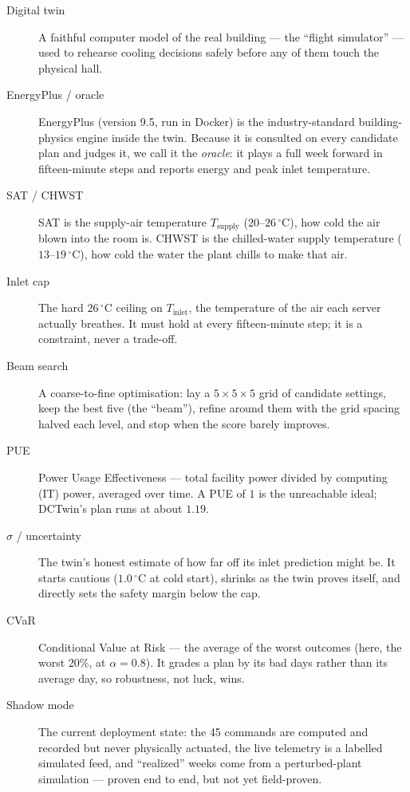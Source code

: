 \begin{description}
  \item[Digital twin] A faithful computer model of the real building --- the ``flight simulator'' --- used to rehearse cooling decisions safely before any of them touch the physical hall.
  \item[EnergyPlus / oracle] EnergyPlus (version 9.5, run in Docker) is the industry-standard building-physics engine inside the twin. Because it is consulted on every candidate plan and judges it, we call it the \emph{oracle}: it plays a full week forward in fifteen-minute steps and reports energy and peak inlet temperature.
  \item[SAT / CHWST] SAT is the supply-air temperature $T_{\text{supply}}$ ($20$--$26\,^\circ$C), how cold the air blown into the room is. CHWST is the chilled-water supply temperature ($13$--$19\,^\circ$C), how cold the water the plant chills to make that air.
  \item[Inlet cap] The hard $26\,^\circ$C ceiling on $T_{\text{inlet}}$, the temperature of the air each server actually breathes. It must hold at every fifteen-minute step; it is a constraint, never a trade-off.
  \item[Beam search] A coarse-to-fine optimisation: lay a $5\times5\times5$ grid of candidate settings, keep the best five (the ``beam''), refine around them with the grid spacing halved each level, and stop when the score barely improves.
  \item[PUE] Power Usage Effectiveness --- total facility power divided by computing (IT) power, averaged over time. A PUE of $1$ is the unreachable ideal; DCTwin's plan runs at about $1.19$.
  \item[$\sigma$ / uncertainty] The twin's honest estimate of how far off its inlet prediction might be. It starts cautious ($1.0\,^\circ$C at cold start), shrinks as the twin proves itself, and directly sets the safety margin below the cap.
  \item[CVaR] Conditional Value at Risk --- the average of the worst outcomes (here, the worst $20\%$, at $\alpha = 0.8$). It grades a plan by its bad days rather than its average day, so robustness, not luck, wins.
  \item[Shadow mode] The current deployment state: the 45 commands are computed and recorded but never physically actuated, the live telemetry is a labelled simulated feed, and ``realized'' weeks come from a perturbed-plant simulation --- proven end to end, but not yet field-proven.
\end{description}